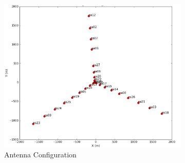 

\begin{figure}[h!]
	\centering
	\begin{subfigure}[b]{0.28\linewidth}
		\includegraphics[width=\linewidth, trim={18px 19px 18px 18px}, clip]{./chapters/01.intro/img/antennas.png}
		\caption{Antenna Configuration}
	\end{subfigure}
	\begin{subfigure}[b]{0.28\linewidth}

\end{subfigure}
\end{figure}
